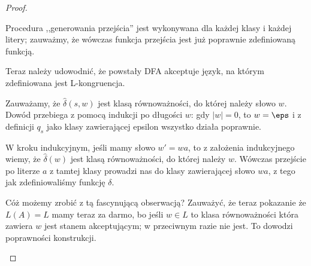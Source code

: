 \begin{proof}
\begin{description}
		      Procedura ,,generowania przejścia'' jest wykonywana dla każdej klasy i każdej litery; zauważmy, że wówczas funkcja przejścia jest już poprawnie zdefiniowaną funkcją.

		      Teraz należy udowodnić, że powstały DFA akceptuje język, na którym zdefiniowana jest L-kongruencja.

		      Zauważamy, że \(\hat\delta(s, w) \) jest klasą równoważności, do której należy słowo \(w\). Dowód przebiega z pomocą indukcji po długości \(w\): gdy \(|w| = 0\), to \( w = \eps \) i z definicji \(q_s\) jako klasy zawierającej epsilon wszystko działa poprawnie.

		      W kroku indukcyjnym, jeśli mamy słowo \(w' = wa\), to z założenia indukcyjnego wiemy, że \(\hat\delta(w)\) jest klasą równoważności, do której należy \(w\). Wówczas przejście po literze \(a\) z tamtej klasy prowadzi nas do klasy zawierającej słowo \(wa\), z tego jak zdefiniowaliśmy funkcję \(\delta\).

		      Cóż możemy zrobić z tą fascynującą obserwacją? Zauważyć, że teraz pokazanie że \(L(A) = L\) mamy teraz za darmo, bo jeśli \(w \in L\) to klasa równoważności która zawiera \(w\) jest stanem akceptującym; w przeciwnym razie nie jest. To dowodzi poprawności konstrukcji.


	\end{description}
\end{proof}